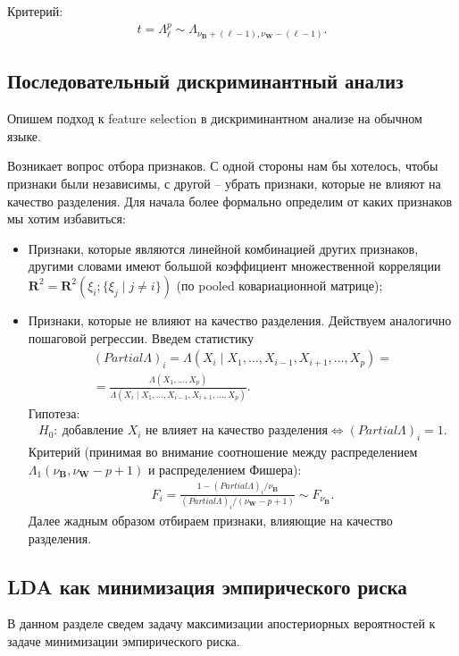 \documentclass{article}
\begin{document}
Критерий:
\begin{align*}
t = \Lambda_{\ell}^{p} \sim \Lambda_{\nu_\mathbf{B} + (\ell - 1), \nu_\mathbf{W} - (\ell - 1)}.
\end{align*}

\subsection{Последовательный дискриминантный анализ}
Опишем подход к feature selection в дискриминантном анализе на обычном языке.

Возникает вопрос отбора признаков. С одной стороны нам бы хотелось, чтобы признаки были независимы, с другой -- убрать признаки, которые не влияют на качество разделения. Для начала более формально определим от каких признаков мы хотим избавиться:
\begin{itemize}
  \item Признаки, которые являются линейной комбинацией других признаков, другими словами имеют большой коэффициент множественной корреляции $\mathbf{R}^2 = \mathbf{R}^2(\xi_i;\{\xi_j \mid j \neq i\})$ (по pooled ковариационной матрице);
  \item Признаки, которые не влияют на качество разделения. Действуем аналогично пошаговой регрессии. Введем статистику
  \begin{multline*}
    (Partial \Lambda)_i = \Lambda(X_i \mid X_1, \ldots, X_{i - 1}, X_{i + 1}, \ldots, X_p) = \\
    = \frac{\Lambda(X_1, \ldots, X_p)}{\Lambda(X_i \mid X_1, \ldots, X_{i - 1}, X_{i + 1}, \ldots, X_p)}.
  \end{multline*}
  Гипотеза:
  \begin{align*}
    H_0 :~\text{добавление  $X_i$ не влияет на качество разделения} \Leftrightarrow (Partial \Lambda)_i = 1.
  \end{align*}
  Критерий (принимая во внимание соотношение между распределением $\Lambda_1(\nu_\mathbf{B}, \nu_\mathbf{W} - p + 1)$ и распределением Фишера):
  \begin{align*}
    F_i = \frac{1 - (Partial \Lambda)_i / \nu_\mathbf{B}}{(Partial \Lambda)_i/ (\nu_\mathbf{W} - p + 1)} \sim F_{\nu_\mathbf{B}}.
  \end{align*}
  Далее жадным образом отбираем признаки, влияющие на качество разделения.
\end{itemize}

\subsection{LDA как минимизация эмпирического риска}
В данном разделе сведем задачу максимизации апостериорных вероятностей к задаче минимизации эмпирического риска.
\end{document}
